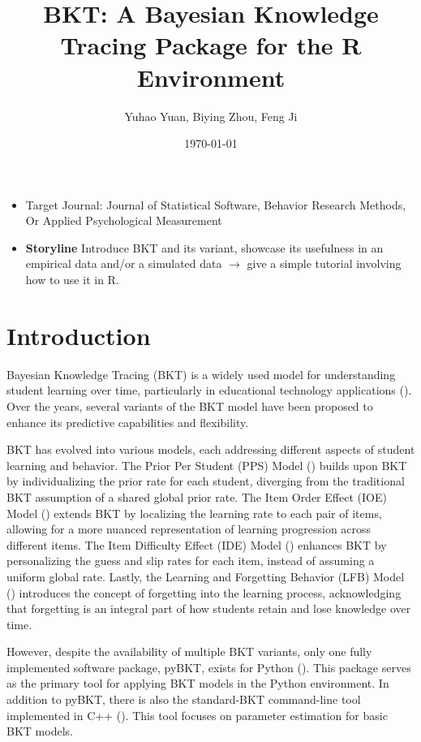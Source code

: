 \documentclass{article}
\title{BKT: A Bayesian Knowledge Tracing Package for the R Environment}
\author{Yuhao Yuan, Biying Zhou, Feng Ji}
\date{\today}
\begin{document}
\maketitle

\begin{itemize}
    \item Target Journal: Journal of Statistical Software, Behavior Research Methods, Or Applied Psychological Measurement
    \item \textbf{Storyline} Introduce BKT and its variant, showcase its usefulness in an empirical data and/or a simulated data $\rightarrow$ give a simple tutorial involving how to use it in R.
\end{itemize}
\section{Introduction}

Bayesian Knowledge Tracing (BKT) is a widely used model for understanding student learning over time, particularly in educational technology applications (\cite{corbett1994knowledge}). Over the years, several variants of the BKT model have been proposed to enhance its predictive capabilities and flexibility. 

BKT has evolved into various models, each addressing different aspects of student learning and behavior. The Prior Per Student (PPS) Model (\cite{multiprior}) builds upon BKT by individualizing the prior rate for each student, diverging from the traditional BKT assumption of a shared global prior rate. The Item Order Effect (IOE) Model (\cite{multipair}) extends BKT by localizing the learning rate to each pair of items, allowing for a more nuanced representation of learning progression across different items. The Item Difficulty Effect (IDE) Model (\cite{multiguess}) enhances BKT by personalizing the guess and slip rates for each item, instead of assuming a uniform global rate. Lastly, the Learning and Forgetting Behavior (LFB) Model (\cite{forget}) introduces the concept of forgetting into the learning process, acknowledging that forgetting is an integral part of how students retain and lose knowledge over time.

However, despite the availability of multiple BKT variants, only one fully implemented software package, pyBKT, exists for Python (\cite{badrinath2021pybkt}). This package serves as the primary tool for applying BKT models in the Python environment. In addition to pyBKT, there is also the standard-BKT command-line tool implemented in C++ (\cite{standardBKT}). This tool focuses on parameter estimation for basic BKT models.
\end{document}
